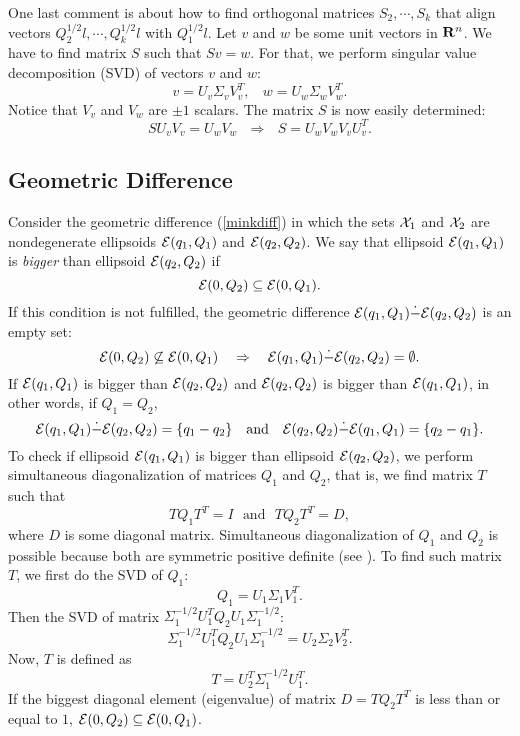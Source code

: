 One last comment is about how to find orthogonal matrices $S_2,\cdots,S_k$
that align vectors $Q_2^{1/2}l, \cdots, Q_k^{1/2}l$ with $Q_1^{1/2}l$.
Let $v$ and $w$ be some unit vectors in ${\bf R}^n$.
We have to find matrix $S$ such that $Sv=w$. For that,
we perform singular value decomposition (SVD) of vectors $v$ and $w$:
\begin{equation}
v = U_v\Sigma_vV_v^T, ~~~~ w = U_w\Sigma_wV_w^T . \label{valign1}
\end{equation}
Notice that $V_v$ and $V_w$ are $\pm1$ scalars.
The matrix $S$ is now easily determined:
\begin{equation}
S U_vV_v = U_wV_w ~~~ \Rightarrow ~~~ S = U_wV_wV_vU_v^T. \label{valign2}
\end{equation}










\subsection{Geometric Difference}
Consider the geometric difference (\ref{minkdiff}) in which the sets $\XX_1$ and
$\XX_2$ are nondegenerate ellipsoids $\EE(q_1,Q_1)$ and $\EE(q_2,Q_2)$.
We say that ellipsoid $\EE(q_1,Q_1)$ is {\it bigger} than ellipsoid
$\EE(q_2,Q_2)$ if
\[ \EE(0,Q_2) \subseteq \EE(0,Q_1). \]
If this condition is not fulfilled,  the geometric difference
$\EE(q_1,Q_1)\dot{-}\EE(q_2,Q_2)$ is an empty set:
\[ \EE(0,Q_2) \not\subseteq \EE(0,Q_1) ~~~ \Rightarrow ~~~
\EE(q_1,Q_1) \dot{-}\EE(q_2,Q_2) = \emptyset. \]
If $\EE(q_1,Q_1)$ is bigger than $\EE(q_2,Q_2)$ and
$\EE(q_2,Q_2)$ is bigger than $\EE(q_1,Q_1)$, in other words, if $Q_1=Q_2$,
\[ \EE(q_1,Q_1) \dot{-}\EE(q_2,Q_2) = \{q_1-q_2\} ~~~ \mbox{and} ~~~
\EE(q_2,Q_2) \dot{-}\EE(q_1,Q_1) = \{q_2-q_1\}. \]
To check if ellipsoid $\EE(q_1,Q_1)$ is bigger than ellipsoid $\EE(q_2,Q_2)$,
we perform simultaneous diagonalization of matrices $Q_1$ and $Q_2$, that is,
we find matrix $T$ such that
\[ TQ_1T^T = I ~~~ \mbox{and} ~~~ TQ_2T^T=D, \]
where $D$ is some diagonal matrix.
Simultaneous diagonalization of $Q_1$ and $Q_2$ is possible
because both are symmetric positive definite (see \cite{gant}).
To find such matrix $T$, we first do the SVD of $Q_1$:
\begin{equation}
Q_1 = U_1\Sigma_1V_1^T . \label{simdiag1}
\end{equation}
Then the SVD of matrix $\Sigma_1^{-1/2}U_1^TQ_2U_1\Sigma_1^{-1/2}$:
\begin{equation}
\Sigma_1^{-1/2}U_1^TQ_2U_1\Sigma_1^{-1/2} = U_2\Sigma_2V_2^T. \label{simdiag2}
\end{equation}
Now, $T$ is defined as
\begin{equation}
T = U_2^T \Sigma_1^{-1/2}U_1^T.  \label{simdiag3}
\end{equation}
If the biggest diagonal element (eigenvalue) of matrix $D=TQ_2T^T$ is less than
or equal to $1$,  $\EE(0,Q_2)\subseteq\EE(0,Q_1)$.

